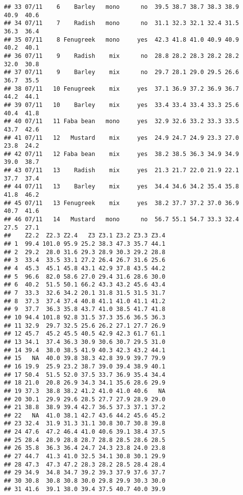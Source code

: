 \documentclass[
]{article}
\begin{document}
\begin{verbatim}
## 33 07/11    6    Barley   mono      no  39.5 38.7 38.7 38.3 38.9 40.9  40.6
## 34 07/11    7    Radish   mono      no  31.1 32.3 32.1 32.4 31.5 36.3  36.4
## 35 07/11    8 Fenugreek   mono     yes  42.3 41.8 41.0 40.9 40.9 40.2  40.1
## 36 07/11    9    Radish    mix      no  28.8 28.2 28.3 28.2 28.2 32.0  30.8
## 37 07/11    9    Barley    mix      no  29.7 28.1 29.0 29.5 26.6 36.7  35.5
## 38 07/11   10 Fenugreek    mix     yes  37.1 36.9 37.2 36.9 36.7 44.2  44.1
## 39 07/11   10    Barley    mix     yes  33.4 33.4 33.4 33.3 25.6 40.4  41.8
## 40 07/11   11 Faba bean   mono     yes  32.9 32.6 33.2 33.3 33.5 43.7  42.6
## 41 07/11   12   Mustard    mix     yes  24.9 24.7 24.9 23.3 27.0 23.8  24.2
## 42 07/11   12 Faba bean    mix     yes  38.2 38.5 36.3 34.9 34.9 39.0  38.7
## 43 07/11   13    Radish    mix     yes  21.3 21.7 22.0 21.9 22.1 37.7  37.4
## 44 07/11   13    Barley    mix     yes  34.4 34.6 34.2 35.4 35.8 41.8  46.2
## 45 07/11   13 Fenugreek    mix     yes  38.2 37.7 37.2 37.0 36.9 40.7  41.6
## 46 07/11   14   Mustard   mono      no  56.7 55.1 54.7 33.3 32.4 27.5  27.1
##    Z2.2  Z2.3 Z2.4   Z3 Z3.1 Z3.2 Z3.3 Z3.4
## 1  99.4 101.0 95.9 25.2 38.3 47.3 35.7 44.1
## 2  29.2  28.0 31.6 29.3 28.9 30.3 29.2 28.8
## 3  33.4  33.5 33.1 27.2 26.4 26.7 31.6 25.6
## 4  45.3  45.1 45.8 43.1 42.9 37.8 43.5 44.2
## 5  96.6  82.0 58.6 27.0 29.4 31.6 28.6 30.0
## 6  40.2  51.5 50.1 66.2 43.3 43.2 45.6 43.4
## 7  33.3  32.6 34.2 20.1 31.8 31.5 31.5 31.7
## 8  37.3  37.4 37.4 40.8 41.1 41.0 41.1 41.2
## 9  37.7  36.3 35.8 43.7 41.0 38.5 41.7 41.8
## 10 94.4 101.8 92.8 31.5 37.3 35.6 36.5 36.3
## 11 32.9  29.7 32.5 25.6 26.2 27.1 27.7 26.9
## 12 45.7  45.2 45.5 40.5 42.9 42.3 61.7 61.1
## 13 34.1  37.4 36.3 30.9 30.6 30.7 29.5 31.0
## 14 39.4  38.0 38.5 41.9 40.3 42.3 43.2 44.1
## 15   NA  40.0 39.8 38.3 42.8 39.9 39.7 79.9
## 16 19.9  25.9 23.2 38.7 39.0 39.4 38.9 40.1
## 17 50.4  51.5 52.0 37.5 33.7 36.9 35.4 34.4
## 18 21.0  20.8 26.9 34.3 34.1 35.6 28.6 29.9
## 19 37.3  38.8 38.2 41.2 41.0 41.0 40.6   NA
## 20 30.1  29.9 29.6 28.5 27.7 27.9 28.9 29.0
## 21 38.8  38.9 39.4 42.7 36.5 37.3 37.1 37.2
## 22   NA  41.0 38.1 42.7 43.6 44.2 45.6 45.2
## 23 32.4  31.9 31.3 31.1 30.8 30.7 30.8 39.8
## 24 47.6  47.2 46.4 41.0 40.6 39.1 38.4 37.5
## 25 28.4  28.9 28.8 28.7 28.8 28.5 28.6 28.5
## 26 35.8  36.3 36.4 24.7 24.3 23.8 24.0 23.8
## 27 44.7  41.3 41.0 32.5 34.1 30.8 30.1 29.9
## 28 47.3  47.3 47.2 28.3 28.2 28.5 28.4 28.4
## 29 34.9  34.8 34.7 39.2 39.3 37.9 37.6 37.7
## 30 30.8  30.8 30.8 30.0 29.8 29.9 30.3 30.0
## 31 41.6  39.1 38.0 39.4 37.5 40.7 40.0 39.9

\end{verbatim}
\end{document}

